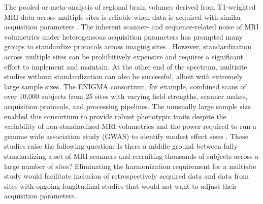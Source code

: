 The pooled  or meta-analysis of regional brain volumes derived from T1-weighted MRI data across multiple sites is reliable when data is acquired with similar acquisition parameters \cite{cannon2014,multicenter01,freesurferReliability}. The inherent scanner- and sequence-related noise of MRI volumetrics under heterogeneous acquisition parameters has prompted many groups to standardize protocols across imaging sites \cite{cannon2014,adniharmonize,ADNIReview}. However, standardization across multiple sites can be prohibitively expensive and requires a significant effort to implement and maintain. %
At the other end of the spectrum, multisite studies without standardization can also be successful, albeit with extremely large sample sizes. The ENIGMA consortium, for example, combined scans of over 10,000 subjects from 25 sites with varying field strengths, scanner makes, acquisition protocols, and processing pipelines. The unusually large sample size enabled this consortium to provide robust phenotypic traits despite the variability of non-standardized MRI volumetrics and the power required to run a genome wide association study (GWAS) to identify modest effect sizes \cite{thompson2014enigma}. These studies raise the following question: Is there a middle ground between fully standardizing a set of MRI scanners and recruiting thousands of subjects across a large number of sites? Eliminating the harmonization requirement for a multisite study would facilitate inclusion of retrospectively acquired data and data from sites with ongoing longitudinal studies that would not want to adjust their acquisition parameters.